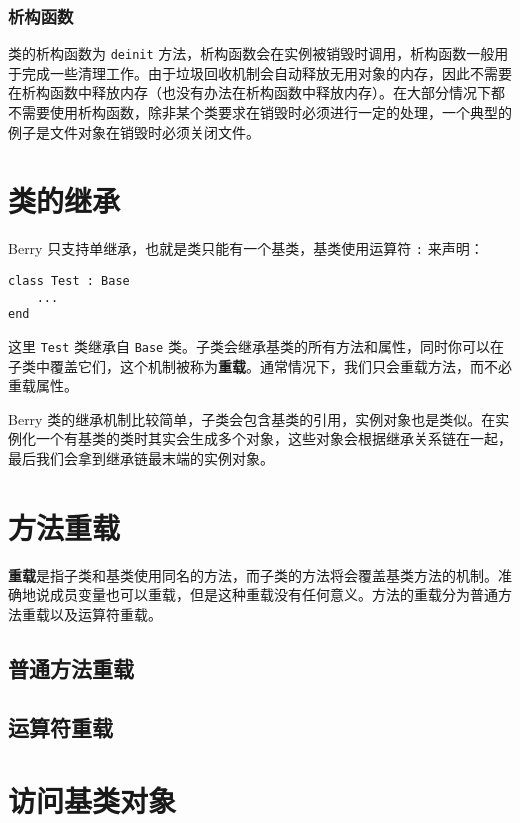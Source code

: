 \subsubsection{析构函数}

类的析构函数为 \texttt{deinit} 方法，析构函数会在实例被销毁时调用，析构函数一般用于完成一些清理工作。由于垃圾回收机制会自动释放无用对象的内存，因此不需要在析构函数中释放内存（也没有办法在析构函数中释放内存）。在大部分情况下都不需要使用析构函数，除非某个类要求在销毁时必须进行一定的处理，一个典型的例子是文件对象在销毁时必须关闭文件。

\section{类的继承}

Berry 只支持单继承，也就是类只能有一个基类，基类使用运算符 \texttt{:} 来声明：
\begin{lstlisting}[language=berry, numbers=none]
class Test : Base
    ...
end
\end{lstlisting}
这里 \texttt{Test} 类继承自 \texttt{Base} 类。子类会继承基类的所有方法和属性，同时你可以在子类中覆盖它们，这个机制被称为\textbf{重载}。通常情况下，我们只会重载方法，而不必重载属性。

Berry 类的继承机制比较简单，子类会包含基类的引用，实例对象也是类似。在实例化一个有基类的类时其实会生成多个对象，这些对象会根据继承关系链在一起，最后我们会拿到继承链最末端的实例对象。

\section{方法重载}

\textbf{重载}是指子类和基类使用同名的方法，而子类的方法将会覆盖基类方法的机制。准确地说成员变量也可以重载，但是这种重载没有任何意义。方法的重载分为普通方法重载以及运算符重载。

\subsection{普通方法重载}

\subsection{运算符重载}

\section{访问基类对象}
